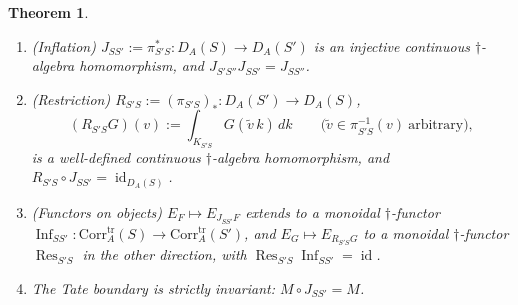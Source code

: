 \documentclass[11pt]{amsart}
\newtheorem{theorem}{Theorem}[section]
\theoremstyle{definition}
\theoremstyle{remark}
\newcommand{\id}{\operatorname{id}}
\newcommand{\Inf}{\operatorname{Inf}}
\newcommand{\Rest}{\operatorname{Res}}
\newcommand{\DA}{D_A}
\newcommand{\Corrtr}{\mathrm{Corr}^{\mathrm{tr}}_{A}}
\begin{document}
\begin{theorem}\label{thm:chartsystem}
\begin{enumerate}
\item[(a)] \emph{(Inflation)}  $J_{SS'}:=\pi_{S'S}^{*}:\DA(S)\to\DA(S')$ is an
injective continuous $\dagger$-algebra homomorphism, and
$J_{S'S''}J_{SS'}=J_{SS''}$.
\item[(b)] \emph{(Restriction)}  $R_{S'S}:=(\pi_{S'S})_{*}:\DA(S')\to\DA(S)$,
\begin{equation}\label{eq:RTS}
(R_{S'S}G)(v):=\int_{K_{S'S}}G(\tilde v\,k)\,dk\qquad
\bigl(\tilde v\in\pi_{S'S}^{-1}(v)\ \text{arbitrary}\bigr),
\end{equation}
is a well-defined continuous $\dagger$-algebra homomorphism, and
$R_{S'S}\circ J_{SS'}=\id_{\DA(S)}$.
\item[(c)] \emph{(Functors on objects)}  $E_F\mapsto E_{J_{SS'}F}$ extends to a
monoidal $\dagger$-functor $\Inf_{SS'}:\Corrtr(S)\to\Corrtr(S')$, and
$E_G\mapsto E_{R_{S'S}G}$ to a monoidal $\dagger$-functor $\Rest_{S'S}$ in the
other direction, with $\Rest_{S'S}\Inf_{SS'}=\id$.
\item[(d)] The Tate boundary is strictly invariant: $M\circ J_{SS'}=M$.
\end{enumerate}
\end{theorem}
\end{document}
